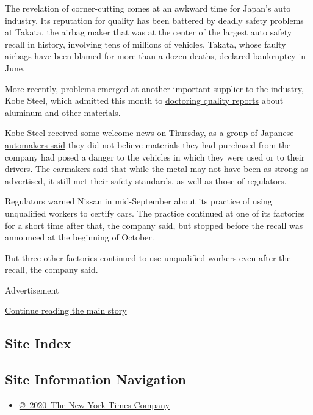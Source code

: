 The revelation of corner-cutting comes at an awkward time for Japan's
auto industry. Its reputation for quality has been battered by deadly
safety problems at Takata, the airbag maker that was at the center of
the largest auto safety recall in history, involving tens of millions of
vehicles. Takata, whose faulty airbags have been blamed for more than a
dozen deaths,
\href{https://www.nytimes.com/2017/06/26/business/takata-japan-bankruptcy.html}{declared
bankruptcy} in June.

More recently, problems emerged at another important supplier to the
industry, Kobe Steel, which admitted this month to
\href{https://www.nytimes.com/2017/10/10/business/kobe-steel-japan.html}{doctoring
quality reports} about aluminum and other materials.

Kobe Steel received some welcome news on Thursday, as a group of
Japanese
\href{https://www.nytimes.com/2017/10/19/business/kobe-steel-scandal-safe.html}{automakers
said} they did not believe materials they had purchased from the company
had posed a danger to the vehicles in which they were used or to their
drivers. The carmakers said that while the metal may not have been as
strong as advertised, it still met their safety standards, as well as
those of regulators.

Regulators warned Nissan in mid-September about its practice of using
unqualified workers to certify cars. The practice continued at one of
its factories for a short time after that, the company said, but stopped
before the recall was announced at the beginning of October.

But three other factories continued to use unqualified workers even
after the recall, the company said.

Advertisement

\protect\hyperlink{after-bottom}{Continue reading the main story}

\hypertarget{site-index}{%
\subsection{Site Index}\label{site-index}}

\hypertarget{site-information-navigation}{%
\subsection{Site Information
Navigation}\label{site-information-navigation}}

\begin{itemize}
\tightlist
\item
  \href{https://help.nytimes.com/hc/en-us/articles/115014792127-Copyright-notice}{©~2020~The
  New York Times Company}
\end{itemize}

